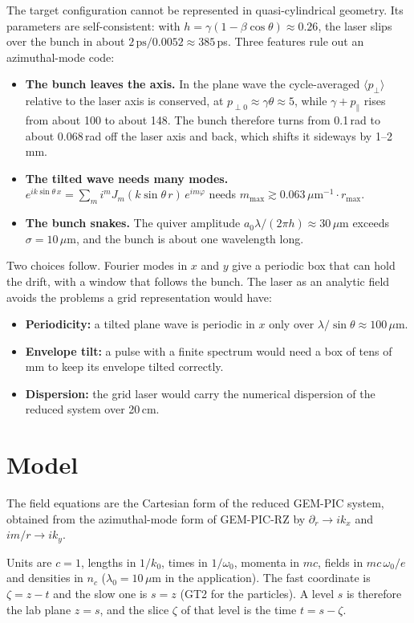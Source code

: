 \documentclass[11pt,a4paper]{article}
\begin{document}
The target configuration cannot be represented in quasi-cylindrical geometry. Its parameters are self-consistent: with $h=\gamma(1-\beta\cos\theta)\approx0.26$, the laser slips over the bunch in about $2\,\text{ps}/0.0052\approx385$\,ps. Three features rule out an azimuthal-mode code:
\begin{itemize}
\item \textbf{The bunch leaves the axis.} In the plane wave the cycle-averaged $\langle p_\perp\rangle$ relative to the laser axis is conserved, at $p_{\perp0}\approx\gamma\theta\approx5$, while $\gamma+p_\parallel$ rises from about 100 to about 148. The bunch therefore turns from 0.1\,rad to about 0.068\,rad off the laser axis and back, which shifts it sideways by 1--2\,mm.
\item \textbf{The tilted wave needs many modes.} $e^{ik\sin\theta\,x}=\sum_m i^m J_m(k\sin\theta\,r)\,e^{im\varphi}$ needs $m_{\max}\gtrsim 0.063\,\mu\text{m}^{-1}\cdot r_{\max}$.
\item \textbf{The bunch snakes.} The quiver amplitude $a_0\lambda/(2\pi h)\approx30\,\mu$m exceeds $\sigma=10\,\mu$m, and the bunch is about one wavelength long.
\end{itemize}

Two choices follow. Fourier modes in $x$ and $y$ give a periodic box that can hold the drift, with a window that follows the bunch. The laser as an analytic field avoids the problems a grid representation would have:
\begin{itemize}
\item \textbf{Periodicity:} a tilted plane wave is periodic in $x$ only over $\lambda/\sin\theta\approx100\,\mu$m.
\item \textbf{Envelope tilt:} a pulse with a finite spectrum would need a box of tens of mm to keep its envelope tilted correctly.
\item \textbf{Dispersion:} the grid laser would carry the numerical dispersion of the reduced system over 20\,cm.
\end{itemize}

\section{Model}

The field equations are the Cartesian form of the reduced GEM-PIC system, obtained from the azimuthal-mode form of GEM-PIC-RZ by $\partial_r\to ik_x$ and $im/r\to ik_y$.

Units are $c=1$, lengths in $1/k_0$, times in $1/\omega_0$, momenta in $mc$, fields in $mc\,\omega_0/e$ and densities in $n_c$ ($\lambda_0=10\,\mu$m in the application). The fast coordinate is $\zeta=z-t$ and the slow one is $s=z$ (GT2 for the particles). A level $s$ is therefore the lab plane $z=s$, and the slice $\zeta$ of that level is the time $t=s-\zeta$.
\end{document}
